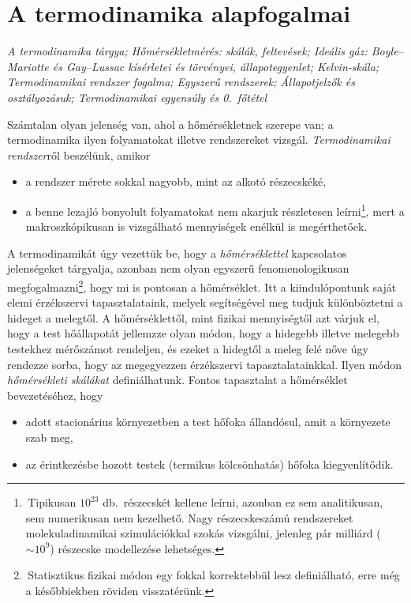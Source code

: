 \section{A termodinamika alapfogalmai}

\emph{A termodinamika tárgya; Hőmérsékletmérés: skálák, feltevések; Ideális gáz: Boyle--Mariotte és Gay--Lussac kísérletei és törvényei, állapotegyenlet; Kelvin-skála; Termodinamikai rendszer fogalma;
Egyszerű rendszerek; Állapotjelzők és osztályozásuk; Termodinamikai egyensúly és 0.~főtétel}

Számtalan olyan jelenség van, ahol a hőmérsékletnek szerepe van; a termodinamika ilyen folyamatokat illetve rendszereket vizsgál. \emph{Termodinamikai rendszer}ről beszélünk, amikor
\begin{itemize}
    \item a rendszer mérete sokkal nagyobb, mint az alkotó részecskéké,
    \item a benne lezajló bonyolult folyamatokat nem akarjuk részletesen leírni\footnote{\,Tipikusan $10^{23}$ db.~részecskét kellene leírni, azonban ez sem analitikusan, sem numerikusan nem kezelhető. Nagy részecskeszámú rendszereket molekuladinamikai szimulációkkal szokás vizsgálni, jelenleg pár milliárd ($\sim10^9$) részecske modellezése lehetséges.}, mert a makroszkópikusan is vizsgálható mennyiségek enélkül is megérthetőek.
\end{itemize}
A termodinamikát úgy vezettük be, hogy a \emph{hőmérséklettel} kapcsolatos jelenségeket tárgyalja, azonban nem olyan egyszerű fenomenologikusan megfogalmazni\footnote{\,Statisztikus fizikai módon egy fokkal korrektebbül lesz definiálható, erre még a későbbiekben röviden visszatérünk.}, hogy mi is pontosan a hőmérséklet. Itt a kiindulópontunk saját elemi érzékszervi tapasztalataink, melyek segítségével meg tudjuk különböztetni a hideget a melegtől. A hőmérséklettől, mint fizikai mennyiségtől azt várjuk el, hogy a test hőállapotát jellemzze olyan módon, hogy a hidegebb illetve melegebb testekhez mérőszámot rendeljen, és ezeket a hidegtől a meleg felé nőve úgy rendezze sorba, hogy az megegyezzen érzékszervi tapasztalatainkkal. Ilyen módon \emph{hőmérsékleti skálákat} definiálhatunk. Fontos tapasztalat a hőmérséklet bevezetéséhez, hogy
\begin{itemize}
    \item adott stacionárius környezetben a test hőfoka állandósul, amit a környezete szab meg,
    \item az érintkezésbe hozott testek (termikus kölcsönhatás) hőfoka kiegyenlítődik.
\end{itemize}

